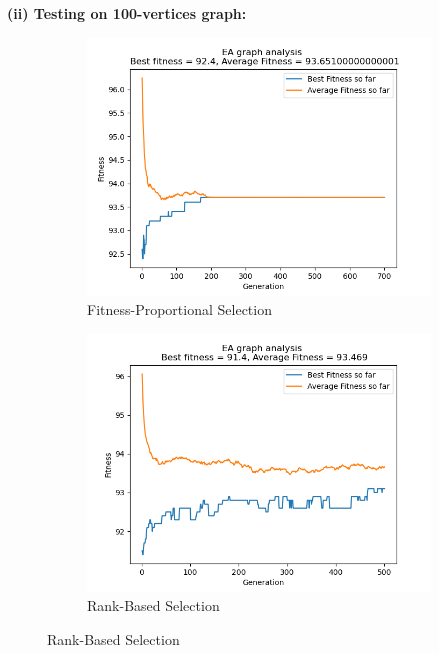 \documentclass[conference,compsoc]{IEEEtran}
\begin{document}
\newpage
\begin{center}
  \textbf{(ii) Testing on 100-vertices graph:}
\end{center}
\begin{figure}[h!]
  \centering 
  \begin{subfigure}{0.34\textwidth}
    \includegraphics[width=\linewidth]{../Results/_100_FPS_Truncation_100_50_700.png}
    \caption{Fitness-Proportional Selection}
  \end{subfigure}
  \begin{subfigure}{0.34\textwidth}
    \includegraphics[width=\linewidth]{../Results/_100_RBS_Truncation_200_100_500.png}
    \caption{Rank-Based Selection}
  \end{subfigure}
\end{figure}
\end{document}
